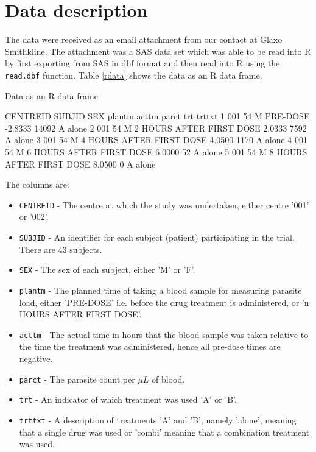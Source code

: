 \section{Data description}
The data were received as an email attachment from our contact at Glaxo Smithkline. The attachment was a SAS data set which was able to be read into R by first exporting from SAS in dbf format and then read into R using the \texttt{read.dbf} function.
Table \ref{rdata} shows the data as an R data frame. 
\begin{table}[h]
\caption{Data as an R data frame}\label{rdata}
\begin{boxedverbatim}
    CENTREID SUBJID SEX                    plantm   acttm  parct trt trttxt
1        001     54   M                  PRE-DOSE -2.8333  14092   A  alone
2        001     54   M  2 HOURS AFTER FIRST DOSE  2.0333   7592   A  alone
3        001     54   M  4 HOURS AFTER FIRST DOSE  4.0500   1170   A  alone
4        001     54   M  6 HOURS AFTER FIRST DOSE  6.0000     52   A  alone
5        001     54   M  8 HOURS AFTER FIRST DOSE  8.0500      0   A  alone
\end{boxedverbatim}
\end{table}

The columns are:
\begin{itemize}
\item\texttt{CENTREID} - The centre at which the study was undertaken, either centre '001' or '002'.
\item\texttt{SUBJID} - An identifier for each subject (patient) participating in the trial. There are 43 subjects.
\item\texttt{SEX} - The sex of each subject, either 'M' or 'F'.
\item\texttt{plantm} - The planned time of taking a blood sample for measuring parasite load, either 'PRE-DOSE' i.e. before the drug treatment is administered, or 'n HOURS AFTER FIRST DOSE'.
\item\texttt{acttm} - The actual time in hours that the blood sample was taken relative to the time the treatment was administered, hence all pre-dose times are negative.
\item\texttt{parct} - The parasite count per $\mu L$ of blood.
\item\texttt{trt} - An indicator of which treatment was used 'A' or 'B'.
\item\texttt{trttxt} - A description of treatments 'A' and 'B', namely 'alone', meaning that a single drug was used or 'combi' meaning that a combination treatment was used.
\end{itemize}

